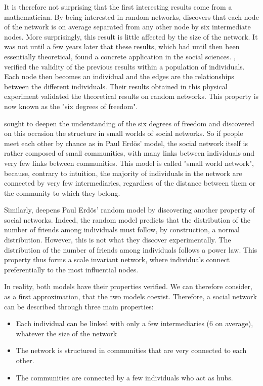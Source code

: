 It is therefore not surprising that the first interesting results come from a mathematician.
By being interested in random networks, \cite{erdosEvolutionRandomGraphs1960} discovers that each node of the network is on average separated from any other node by six intermediate nodes.
More surprisingly, this result is little affected by the size of the network.
It was not until a few years later that these results, which had until then been essentially theoretical, found a concrete application in the social sciences.
\cite{milgramSmallWorldProblem1967}, verified the validity of the previous results within a population of individuals.
Each node then becomes an individual and the edges are the relationships between the different individuals.
Their results obtained in this physical experiment validated the theoretical results on random networks.
This property is now known as the "six degrees of freedom".

\cite{wattsCollectiveDynamicsSmallworld1998} sought to deepen the understanding of the six degrees of freedom and discovered on this occasion the structure in small worlds of social networks.
So if people meet each other by chance as in Paul Erdös' model, the social network itself is rather composed of small communities, with many links between individuals
and very few links between communities.
This model is called "small world network", because, contrary to intuition, the majority of individuals in the network are connected by very few intermediaries, regardless of the distance between them or the community to which they belong.

Similarly, \cite{barabasiEmergenceScalingRandom1999} deepens Paul Erdös' random model by discovering another property of social networks.
Indeed, the random model predicts that the distribution of the number of friends among individuals must follow, by construction, a normal distribution.
However, this is not what they discover experimentally.
The distribution of the number of friends among individuals follows a power law.
This property thus forms a scale invariant network, where individuals connect preferentially to the most influential nodes.

In reality, both models have their properties verified.
We can therefore consider, as a first approximation, that the two models coexist.
Therefore, a social network can be described through three main properties:

\begin{itemize}
    \item Each individual can be linked with only a few intermediaries (6 on average), whatever the size of the network
    \item The network is structured in communities that are very connected to each other.
    \item The communities are connected by a few individuals who act as hubs.
\end{itemize}

